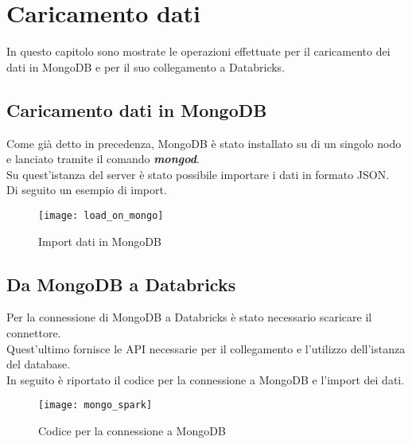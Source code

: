 
\chapter{Caricamento dati}
In questo capitolo sono mostrate le operazioni effettuate per il caricamento
dei dati in MongoDB e per il suo collegamento a Databricks.

\section{Caricamento dati in MongoDB}
Come già detto in precedenza, MongoDB è stato installato su di un singolo nodo
e lanciato tramite il comando \textbf{\textit{mongod}}.\\
Su quest'istanza del server è stato possibile importare i dati in formato JSON.\\
Di seguito un esempio di import.

\begin{figure}[!htbp]
	\centering
	\texttt{[image: load\_on\_mongo]}
  \caption{Import dati in MongoDB}
  \label{}
\end{figure}
\clearpage

\section{Da MongoDB a Databricks}

Per la connessione di MongoDB a Databricks è stato necessario scaricare il connettore.\\
Quest'ultimo fornisce le API necessarie per il collegamento e l'utilizzo dell'istanza del database.\\
In seguito è riportato il codice per la connessione a MongoDB e l'import dei dati.

\begin{figure}[!htbp]
  \texttt{[image: mongo\_spark]}
  \caption{Codice per la connessione a MongoDB}
  \label{mongo_spark}
\end{figure}
